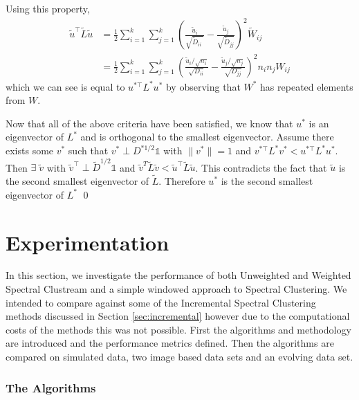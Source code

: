 Using this property, 
\begin{align*}
  \tilde{u}^{\top} \tilde{L} \tilde{u} &= \frac{1}{2} \sum_{i = 1}^k \sum_{j = 1}^k \left( \frac{\tilde{u}_i}{\sqrt{\tilde{D}_{ii \phantom{j}}}} - \frac{\tilde{u}_j}{\sqrt{\tilde{D}_{jj}}}  \right)^2 \tilde{W}_{ij} \\
 &= \frac{1}{2} \sum_{i = 1}^k \sum_{j = 1}^k \left( \frac{\tilde{u}_i / \sqrt{n_i}}{\sqrt{D_{ii}}} - \frac{\tilde{u}_j / \sqrt{n_j}}{\sqrt{D_{jj}}} \right)^2 n_i n_j  W_{ij}
\end{align*}
which we can see is equal to $ u^{* \top}L^*u^*$ by observing that $W^*$ has repeated elements from $W$.

Now that all of the above criteria have been satisfied, we know that $u^*$ is an eigenvector of $L^*$ and is orthogonal to the smallest eigenvector. Assume there exists some $v^*$ such that $v^* \perp D^{* 1/2}\mathds{1}$ with $\|v^*\|=1$ and $v^{* \top}L^*v^* < u^{* \top}L^*u^*$. Then $\exists \; \tilde{v}$ with $\tilde{v}^{\top} \perp \tilde{D}^{1/2}\mathds{1}$ and $\tilde{v}^T \tilde{L} \tilde{v} < \tilde{u}^{\top} \tilde{L} \tilde{u}$. This contradicts the fact that $\tilde{u}$ is the second smallest eigenvector of $\tilde{L}$. Therefore $u^*$ is the second smallest eigenvector of $L^*$ \qed 

\section{Experimentation}
\label{sec:clustream_exp}

In this section, we investigate the performance of both Unweighted and Weighted Spectral Clustream and a simple windowed approach to Spectral Clustering. We intended to compare against some of the Incremental Spectral Clustering methods discussed in Section \ref{sec:incremental} however due to the computational costs of the methods this was not possible. First the algorithms and methodology are introduced and the performance metrics defined. Then the algorithms are compared on simulated data, two image based data sets and an evolving data set. 

\subsubsection{The Algorithms}


